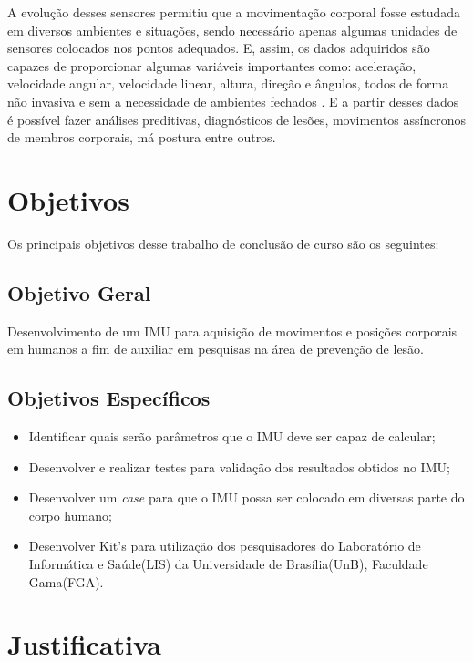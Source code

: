 A evolução desses sensores permitiu que a movimentação corporal fosse estudada em diversos ambientes e situações, sendo necessário apenas algumas unidades de sensores colocados nos pontos adequados. E, assim, os dados adquiridos são capazes de proporcionar algumas variáveis importantes como: aceleração, velocidade angular, velocidade linear, altura, direção e ângulos, todos de forma não invasiva e sem a necessidade de ambientes fechados \cite{chang2016}. E a partir desses dados é possível fazer análises preditivas, diagnósticos de lesões, movimentos assíncronos de membros corporais, má postura entre outros.



\section{Objetivos}

Os principais objetivos desse trabalho de conclusão de curso são os seguintes:

\subsection{Objetivo Geral}

Desenvolvimento de um IMU para aquisição de movimentos e posições corporais em humanos a fim de auxiliar em pesquisas na área de prevenção de lesão.

\subsection {Objetivos Específicos} 
 \begin{itemize} 
		\item Identificar quais serão parâmetros que o IMU deve ser capaz de calcular;
		
		\item Desenvolver e realizar testes para validação dos resultados obtidos no IMU;
		
		\item Desenvolver um \textit{case} para que o IMU possa ser colocado em diversas parte do corpo humano;
		
		\item Desenvolver Kit's para utilização dos pesquisadores do Laboratório de Informática e Saúde(LIS) da Universidade de Brasília(UnB), Faculdade Gama(FGA).
		
		
	\end{itemize}
\section{Justificativa}

